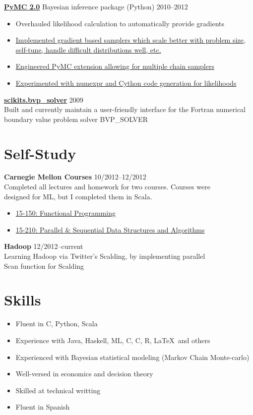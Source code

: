 \documentclass[margin]{res}
\newcommand{\bitem}{\begin{samepage}\begin{itemize} \itemsep -2pt}
\newcommand{\eitem}{\end{itemize}\end{samepage} }
\newcommand{\hrowbase}[3]{
  {\bf #1} #2 \hfill #3
}
\newcommand{\headrow}[3]{
  \hrowbase{#1}{#2}{#3}
    \vspace{6pt}
    \bitem
      }
\newcommand{\eheadrow}[0]{\eitem}
\newcommand{\headrowdesc}[3]{
  \hrowbase{#1}{}{#2} \ \\
    #3
    \vspace{6pt}
      }
\newcommand{\CPP}
{C\nolinebreak[4]\hspace{-.05em}\raisebox{.22ex}{\footnotesize\bf ++}}
\newcommand{\CS}
{C\nolinebreak[4]\hspace{-.05em}\raisebox{.22ex}{\footnotesize\#}}
\begin{document}
\begin{resume}
    \headrow{\href{https://github.com/pymc-devs/pymc\#readme}{PyMC 2.0}}{Bayesian inference package (Python)}{2010--2012}
      \item Overhauled likelihood calculation to automatically provide gradients 
      \item \href{https://github.com/jsalvatier/gradient\_samplers/blob/master/gradient\_samplers}{Implemented gradient based samplers which scale better with problem size, self-tune, handle difficult distributions well, etc.}
      \item \href{http://pypi.python.org/pypi/multichain\_mcmc}{Engineered PyMC extension allowing for multiple chain samplers}
      \item \href{https://github.com/pymc-devs/pymc/commits/numexpr\_dist}{Experimented with numexpr and Cython code generation for likelihoods}
    \eheadrow

    \headrowdesc{\href{packages.python.org/scikits.bvp\_solver}{scikits.bvp\_solver}}{2009}{
      Built and currently maintain a user-friendly interface for the Fortran numerical \\
    boundary value problem solver BVP\_SOLVER}

\section{Self-Study}
    \headrowdesc{Carnegie Mellon Courses}{10/2012--12/2012}{Completed all lectures and homework for two courses. Courses were \\
    designed for ML, but I completed them in Scala.} 
    \bitem
      \item \href{http://www.cs.cmu.edu/~15150/previous-semesters/2012-spring/}{15-150: Functional Programming}
      \item \href{http://www.cs.cmu.edu/~15210/index.html}{15-210: Parallel \& Sequential Data Structures and Algorithms}
    \eitem
    \headrowdesc{Hadoop}{12/2012--current}{Learning Hadoop via Twitter's Scalding, by implementing parallel \\
      Scan function for Scalding}

\section{Skills}
    \bitem
      \item Fluent in \CS, Python, Scala
      \item Experience with Java, Haskell, ML, C, \CPP, R, \LaTeX\ and others
      \item Experienced with Bayesian statistical modeling (Markov Chain Monte-carlo)
      \item Well-versed in economics and decision theory
      \item Skilled at technical writting
      \item Fluent in Spanish 
    \eitem


\end{resume}
\end{document}
